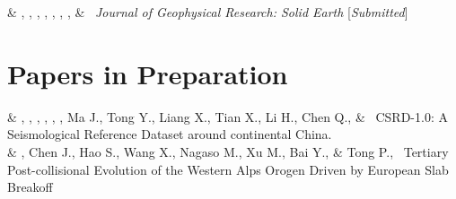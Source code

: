 \begin{EntriesTableExtra}
     &
    \msz, \csh, \Me, \wjp, \wwl, \sunl, \wxx, \& \wlx \ 
    \emph{Journal of Geophysical Research: Solid Earth}
    [\textit{Submitted}]
\end{EntriesTableExtra}

\section{Papers in Preparation}
\begin{EntriesTableExtra}
     &
    \Me\CS, \csh, \wjp, \wwl, \sunl, \wxx, Ma J., Tong Y., Liang X., Tian X., Li H., Chen Q., \& \wlx \ 
    CSRD-1.0: A Seismological Reference Dataset around continental China.
    \\
    \Year{on} &
    \Me, Chen J., Hao S., Wang X., Nagaso M., Xu M., Bai Y., \& Tong P.\CS, \
    Tertiary Post-collisional Evolution of the Western Alps Orogen Driven by European Slab Breakoff
\end{EntriesTableExtra}

